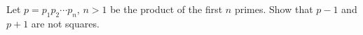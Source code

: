 Let $p = p_1p_2\cdots p_n$, $n > 1$ be the product of the first $n$ primes. Show that $p - 1$ and $p + 1$ are not squares.
